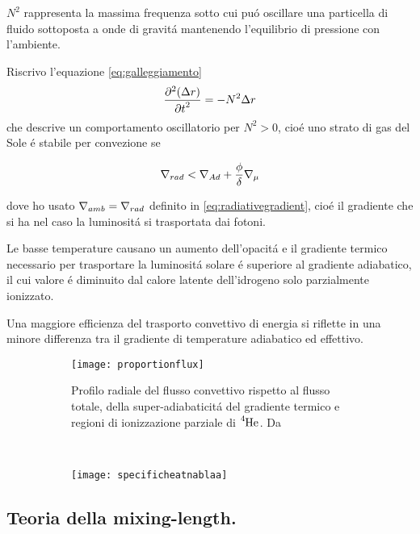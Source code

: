 \documentclass[../main.tex]{subfiles}
\begin{document}
$N^2$ rappresenta la massima frequenza sotto cui pu\'o oscillare una particella di fluido sottoposta a onde di gravit\'a mantenendo l'equilibrio di pressione con l'ambiente.

Riscrivo l'equazione \eqref{eq:galleggiamento}
\begin{equation}
\PtwoDy{t}{(\Delta r)}=-N^2\Delta r
\end{equation}
che descrive un comportamento oscillatorio per $N^2>0$, cio\'e uno strato di gas del Sole \'e stabile per convezione se

\begin{equation}
\nrad{}<\nad+\frac{\phi}{\delta}\nmu{}\label{eq:ledoux}
\end{equation}

dove ho usato $\nabla_{amb}=\nrad{}$ definito in \eqref{eq:radiativegradient}, cio\'e il gradiente che si ha nel caso la luminosit\'a si trasportata dai fotoni.

Le basse temperature causano un aumento dell'opacit\'a e il gradiente termico necessario per trasportare la luminosit\'a solare \'e superiore al gradiente adiabatico, il cui valore \'e diminuito dal calore latente dell'idrogeno solo parzialmente ionizzato.

Una maggiore efficienza del trasporto convettivo di energia si riflette in una minore differenza tra il gradiente di temperature adiabatico ed effettivo.

\begin{figure}[!h]
\begin{subfigure}[l]{0.55\textwidth}
    \texttt{[image: proportionflux]}
    \caption{Profilo radiale del flusso convettivo rispetto al flusso totale, della super-adiabaticit\'a del gradiente termico e regioni di ionizzazione parziale di $\cel{He}{4}{}{}$. Da \cite{gou76convection}}
    \label{fluxproportion}
\end{subfigure}
~
\begin{subfigure}[r]{0.4\textwidth}
\centering
\texttt{[image: specificheatnablaa]}
\end{subfigure}
    
\end{figure}


\subsection{Teoria della mixing-length.}
\end{document}
